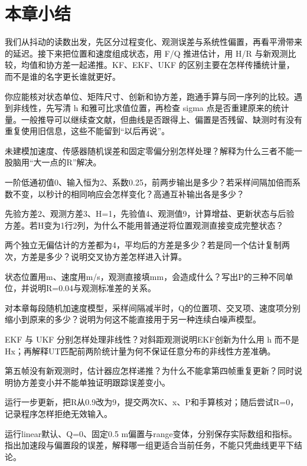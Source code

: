 \section{本章小结}
\begin{conclusion}
我们从抖动的读数出发，先区分过程变化、观测误差与系统性偏置，再看平滑带来的延迟。接下来把位置和速度组成状态，用 F/Q 推进估计，用 H/R 与新观测比较，均值和协方差一起递推。KF、EKF、UKF 的区别主要在怎样传播统计量，而不是谁的名字更长谁就更好。

你应能核对状态单位、矩阵尺寸、创新和协方差，跑通手算与同一序列的比较。遇到非线性，先写清 h 和雅可比求值位置，再检查 sigma 点是否重建原来的统计量。一般推导可以继续查文献，但曲线是否跟得上、偏置是否残留、缺测时有没有重复使用旧信息，这些不能留到“以后再说”。
\end{conclusion}

\begin{problemset}
\item\label{prob:v2-filter-noise} 未建模加速度、传感器随机误差和固定零偏分别怎样处理？解释为什么三者不能一股脑用“大一点的R”解决。
\item\label{prob:v2-filter-response} 一阶低通初值0、输入恒为2、系数0.25，前两步输出是多少？若采样间隔加倍而系数不变，以秒计的相同响应会怎样变化？高通互补输出各是多少？
\item\label{prob:v2-filter-gain} 先验方差2、观测方差3、H=1，先验值4、观测值9，计算增益、更新状态与后验方差。若H变为1行2列，为什么不能用普通逆将位置观测直接变成完整状态？
\item\label{prob:v2-filter-related} 两个独立无偏估计的方差都为4，平均后的方差是多少？若是同一个估计复制两次，方差是多少？说明交叉协方差怎样进入计算。
\item\label{prob:v2-filter-units} 状态位置用m、速度用m/s，观测直接填mm，会造成什么？写出P的三种不同单位，并说明R=0.04与观测标准差的关系。
\item\label{prob:v2-filter-q} 对本章每段随机加速度模型，采样间隔减半时，Q的位置项、交叉项、速度项分别缩小到原来的多少？说明为何这不能直接用于另一种连续白噪声模型。
\item\label{prob:v2-filter-nonlinear} EKF 与 UKF 分别怎样处理非线性？对斜距观测说明EKF创新为什么用 h 而不是 Hx；再解释UT匹配前两阶统计量为何不保证任意分布的非线性方差准确。
\item\label{prob:v2-filter-missing} 第五帧没有新观测时，估计器应怎样递推？为什么不能拿第四帧重复更新？同时说明协方差变小并不能单独证明跟踪误差变小。
\item\label{prob:v2-filter-scalar} 运行一步更新，把R从0.9改为9，提交两次K、x、P和手算核对；随后尝试R=0，记录程序怎样拒绝无效输入。
\item\label{prob:v2-filter-experiment} 运行linear默认、Q=0、固定0.5 m偏置与range变体，分别保存实际数组和指标。指出加速段与偏置段的误差，解释哪一组更适合当前任务，不能只凭曲线更平下结论。
\end{problemset}

